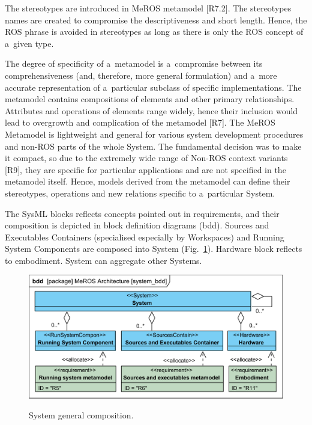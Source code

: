 \documentclass[11pt,oneside,a4paper]{report}
\begin{document}
	The stereotypes are introduced in MeROS metamodel [R7.2].
	The stereotypes names are created to compromise the descriptiveness and short length. Hence, the ROS phrase is avoided in stereotypes as long as there is only the ROS concept of a~given type.
	
	The degree of specificity of a~metamodel is a~compromise between its comprehensiveness (and, therefore, more general formulation) and a~more accurate representation of a~particular subclass of specific implementations. The metamodel contains compositions of elements and other primary relationships. Attributes and operations of elements range widely, hence their inclusion would lead to overgrowth and complication of the metamodel [R7]. The MeROS Metamodel is lightweight and general for various system development procedures and non-ROS parts of the whole System. The fundamental decision was to make it compact, so due to the extremely wide range of Non-ROS context variants [R9], they are specific for particular applications and are not specified in the metamodel itself. Hence, models derived from the metamodel can define their stereotypes, operations and new relations specific to a~particular System. 
	
	The SysML blocks reflects concepts pointed out in requirements, and their composition is depicted in block definition diagrams (bdd). Sources and Executables Containers (specialised especially by Workspaces) and Running System Components are composed into System (Fig.~\ref{fig:ros_system_bdd}). Hardware block reflects to embodiment. System can aggregate other Systems.
	
		
	\begin{figure}[H]
		\centering
		\begin{center}
			{\includegraphics[scale=1.0]{diagrams/system_bdd.png}}
		\end{center}
		\caption{System general composition.} 
		\label{fig:ros_system_bdd}
	\end{figure}
	
\end{document}
